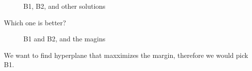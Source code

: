 \begin{figure}[H]
{			}
			\caption{B1, B2, and other solutions}
		\end{figure}

		Which one is better?

		\begin{figure}[H]
			\caption{B1 and B2, and the magins}
		\end{figure}

		We want to find hyperplane that maxximizes the margin, therefore we would pick B1. 



